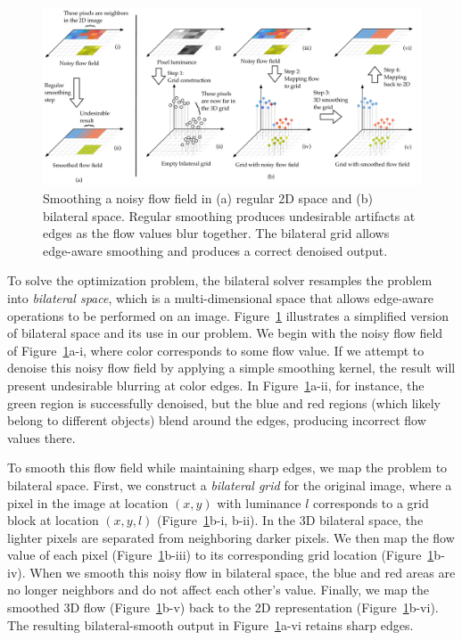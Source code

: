 \begin{figure}
\centering%
\center
\includegraphics[width=\textwidth]{hfbs-figs/bilateral_grid_3d.pdf}
\caption{Smoothing a noisy flow field in (a) regular 2D space and (b) bilateral space. Regular smoothing produces undesirable artifacts at edges as the flow values blur together. The bilateral grid allows edge-aware smoothing and produces a correct denoised output.}%
\label{fig:bilateral_grid_3d}%
\end{figure}

To solve the optimization problem, the bilateral solver resamples the problem into \emph{bilateral space}, which is a multi-dimensional space that allows edge-aware operations to be performed on an image.
Figure~\ref{fig:bilateral_grid_3d} illustrates a simplified version of bilateral space and its use in our problem.
We begin with the noisy flow field of Figure~\ref{fig:bilateral_grid_3d}a-i, where color corresponds to some flow value.
If we attempt to denoise this noisy flow field by applying a simple smoothing kernel, the result will present undesirable blurring at color edges.
In Figure~\ref{fig:bilateral_grid_3d}a-ii, for instance, the green region is successfully denoised, but the blue and red regions (which likely belong to different objects) blend around the edges, producing incorrect flow values there.


To smooth this flow field while maintaining sharp edges, we map the problem to bilateral space.
First, we construct a \emph{bilateral grid} for the original image, where a pixel in the image at location $(x,y)$ with luminance $l$ corresponds to a grid block at location $(x,y,l)$ (Figure~\ref{fig:bilateral_grid_3d}b-i, b-ii).
In the 3D bilateral space, the lighter pixels are separated from neighboring darker pixels.
We then map the flow value of each pixel (Figure~\ref{fig:bilateral_grid_3d}b-iii) to its corresponding grid location (Figure~\ref{fig:bilateral_grid_3d}b-iv).
When we smooth this noisy flow in bilateral space, the blue and red areas are no longer neighbors and do not affect each other's value.
Finally, we map the smoothed 3D flow (Figure~\ref{fig:bilateral_grid_3d}b-v) back to the 2D representation (Figure~\ref{fig:bilateral_grid_3d}b-vi).
The resulting  bilateral-smooth output in Figure~\ref{fig:bilateral_grid_3d}a-vi retains sharp edges.
